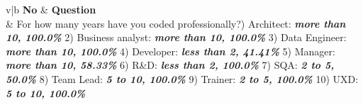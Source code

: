 \newcolumntype{b}{X}
\begin{table}[htbp]
    \centering
    \caption{Highlights of Findings from Survey Closed Questions by Profession}
    \begin{tabularx}{\textwidth}{v|b}
        \hline
        \textbf{No}     & \textbf{Question}  \\          & For how many years have you coded professionally?) Architect: \textbf{\textit{more than 10, 100.0\% } } 2) Business analyst: \textbf{\textit{more than 10, 100.0\% } } 3) Data Engineer: \textbf{\textit{more than 10, 100.0\% } } 4) Developer: \textbf{\textit{less than 2, 41.41\% } } 5) Manager: \textbf{\textit{more than 10, 58.33\% } } 6) R\&D: \textbf{\textit{less than 2, 100.0\% } } 7) SQA: \textbf{\textit{2 to 5, 50.0\% } } 8) Team Lead: \textbf{\textit{5 to 10, 100.0\% } } 9) Trainer: \textbf{\textit{2 to 5, 100.0\% } } 10) UXD: \textbf{\textit{5 to 10, 100.0\% } }    \\ \hline
        

\end{tabularx}
\end{table}
